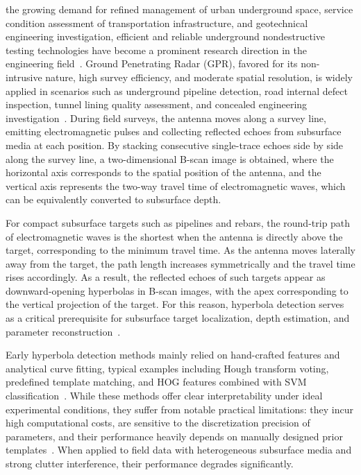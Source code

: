 \documentclass[lettersize,journal]{IEEEtran}
\begin{document}
 the growing demand for refined management of urban underground space, 
service condition assessment of transportation infrastructure, and geotechnical engineering investigation, 
efficient and reliable underground nondestructive testing technologies have become a prominent research 
direction in the engineering field~\cite{lai2018review}. 
Ground Penetrating Radar (GPR), favored for its non-intrusive nature, high survey efficiency, and moderate spatial resolution, 
is widely applied in scenarios such as underground pipeline detection, road internal defect inspection, tunnel lining quality assessment, 
and concealed engineering investigation~\cite{rasol2022road,travassos2021review}. 
During field surveys, the antenna moves along a survey line, 
emitting electromagnetic pulses and collecting reflected echoes from subsurface media at each position. 
By stacking consecutive single-trace echoes side by side along the survey line, 
a two-dimensional B-scan image is obtained, where the horizontal axis corresponds to the spatial position of the antenna, 
and the vertical axis represents the two-way travel time of electromagnetic waves, 
which can be equivalently converted to subsurface depth.

For compact subsurface targets such as pipelines and rebars, 
the round-trip path of electromagnetic waves is the shortest when the antenna is directly above the target, 
corresponding to the minimum travel time. 
As the antenna moves laterally away from the target, 
the path length increases symmetrically and the travel time rises accordingly. 
As a result, the reflected echoes of such targets appear as downward-opening hyperbolas in B-scan images, 
with the apex corresponding to the vertical projection of the target. 
For this reason, hyperbola detection serves as a critical prerequisite for subsurface target localization, 
depth estimation, and parameter reconstruction~\cite{tong2020survey}.

Early hyperbola detection methods mainly relied on hand-crafted features and analytical curve fitting, 
typical examples including Hough transform voting, predefined template matching, 
and HOG features combined with SVM classification~\cite{travassos2021review}. 
While these methods offer clear interpretability under ideal experimental conditions, 
they suffer from notable practical limitations: they incur high computational costs, 
are sensitive to the discretization precision of parameters, 
and their performance heavily depends on manually designed prior templates~\cite{tong2020survey}. 
When applied to field data with heterogeneous subsurface media and strong clutter interference, 
their performance degrades significantly.
\end{document}

